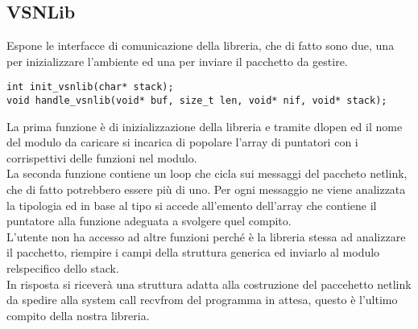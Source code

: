 \subsection{VSNLib}
Espone le interfacce di comunicazione della libreria, che di fatto sono due, una per inizializzare l'ambiente ed una per inviare il pacchetto da gestire.\\
\begin{lstlisting}[style=CStyle]
int init_vsnlib(char* stack);
void handle_vsnlib(void* buf, size_t len, void* nif, void* stack);
\end{lstlisting}
La prima funzione \`e di inizializzazione della libreria e tramite dlopen ed il nome del modulo da caricare si incarica di popolare l'array di puntatori con i corrispettivi delle funzioni nel modulo.\\
La seconda funzione contiene un loop che cicla sui messaggi del paccheto netlink, che di fatto potrebbero essere pi\`u di uno. Per ogni messaggio ne viene analizzata la tipologia ed in base al tipo si accede all'emento dell'array che contiene il puntatore alla funzione adeguata a svolgere quel compito.\\
L'utente non ha accesso ad altre funzioni perch\'e \`e la libreria stessa ad analizzare il pacchetto, riempire i campi della struttura generica ed inviarlo al modulo relspecifico dello stack.\\
In risposta si ricever\`a una struttura adatta alla costruzione del paccehetto netlink da spedire alla system call recvfrom del programma in attesa, questo \`e l'ultimo compito della nostra libreria.
